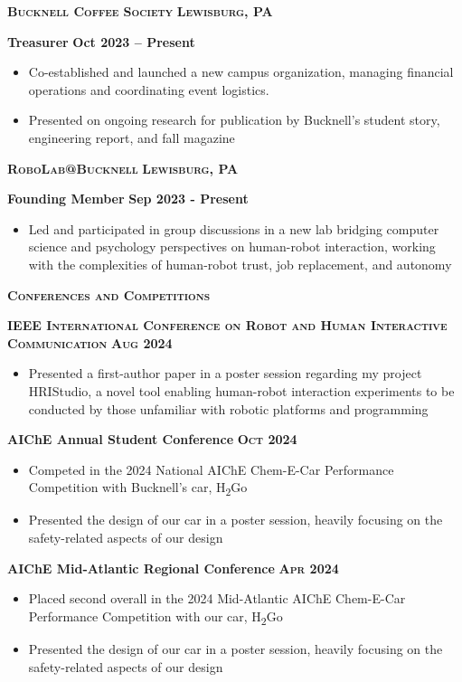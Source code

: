 \documentclass{article}
\newlength{\sectspaceabove}
\newlength{\sectspacebelow}
\newcommand{\textscbf}[1]{\textbf{\textsc{#1}}}
\newcommand{\resumesection}[1]{%
    \vspace{\sectspaceabove}%
    \begin{center}
        \textscbf{#1}
    \end{center}%
    \vspace{\sectspacebelow}%
}
\begin{document}
\textscbf{Bucknell Coffee Society} \hfill \textscbf{Lewisburg, PA}

\textbf{Treasurer} \hfill \textbf{Oct 2023 – Present}
\begin{itemize}[noitemsep,topsep=2pt]
    \item Co-established and launched a new campus organization, managing financial operations and coordinating event logistics.
    \item Presented on ongoing research for publication by Bucknell's student story, engineering report, and fall magazine
\end{itemize}

\textscbf{RoboLab@Bucknell} \hfill \textscbf{Lewisburg, PA}

\textbf{Founding Member} \hfill \textbf{Sep 2023 - Present}
\begin{itemize}[noitemsep,topsep=2pt]
	\item Led and participated in group discussions in a new lab bridging computer science and psychology perspectives on human-robot interaction, working with the complexities of human-robot trust, job replacement, and autonomy
\end{itemize}

\resumesection{Conferences and Competitions}

\textscbf{IEEE International Conference on Robot and Human Interactive Communication} \hfill \textscbf{Aug 2024}
\begin{itemize}[noitemsep,topsep=2pt]
    \item Presented a first-author paper in a poster session regarding my project HRIStudio, a novel tool enabling human-robot interaction experiments to be conducted by those unfamiliar with robotic platforms and programming
\end{itemize}

\textbf{AIChE Annual Student Conference}  \hfill \textscbf{Oct 2024}
\begin{itemize}[noitemsep,topsep=2pt]
    \item Competed in the 2024 National AIChE Chem-E-Car Performance Competition with Bucknell's car, H\textsubscript{2}Go
    \item Presented the design of our car in a poster session, heavily focusing on the safety-related aspects of our design
\end{itemize}

\textbf{AIChE Mid-Atlantic Regional Conference}  \hfill \textscbf{Apr 2024}
\begin{itemize}[noitemsep,topsep=2pt]
    \item Placed second overall in the 2024 Mid-Atlantic AIChE Chem-E-Car Performance Competition with our car, H\textsubscript{2}Go
    \item Presented the design of our car in a poster session, heavily focusing on the safety-related aspects of our design
\end{itemize}
\end{document}
